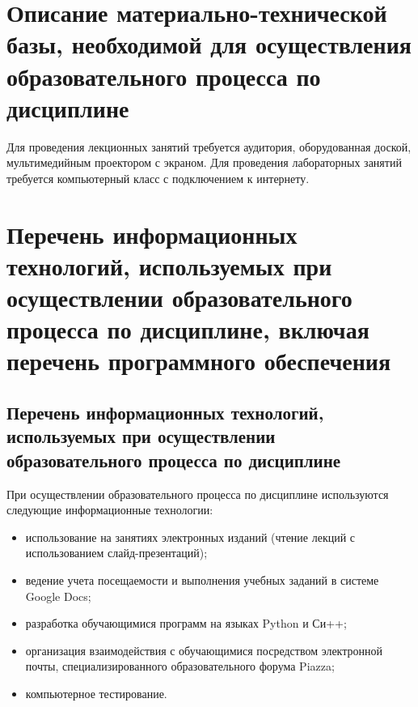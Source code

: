 \documentclass[a4paper,12pt]{article}
\begin{document}
\newpage
\section{Описание материально-технической базы, необходимой для осуществления образовательного процесса по дисциплине}
  
  
       Для проведения лекционных занятий требуется аудитория, оборудованная доской,  мультимедийным проектором с экраном. 
       Для проведения лабораторных занятий требуется компьютерный класс с подключением к интернету.
  
  


\section{Перечень информационных технологий, используемых при осуществлении образовательного процесса по дисциплине, включая перечень программного обеспечения
}

\subsection{Перечень информационных технологий, используемых при осуществлении образовательного процесса по дисциплине}

При осуществлении образовательного процесса по дисциплине используются следующие информационные технологии:
\begin{itemize}[nolistsep]
  
\item использование на занятиях электронных изданий (чтение лекций с использованием слайд-презентаций);
  
\item ведение учета посещаемости и выполнения учебных заданий в системе Google Docs;
  
\item разработка обучающимися программ на языках Python и Си++;
  
\item организация взаимодействия с обучающимися посредством электронной почты, специализированного образовательного форума Piazza;
  
\item компьютерное тестирование.
  
\end{itemize}
\end{document}
